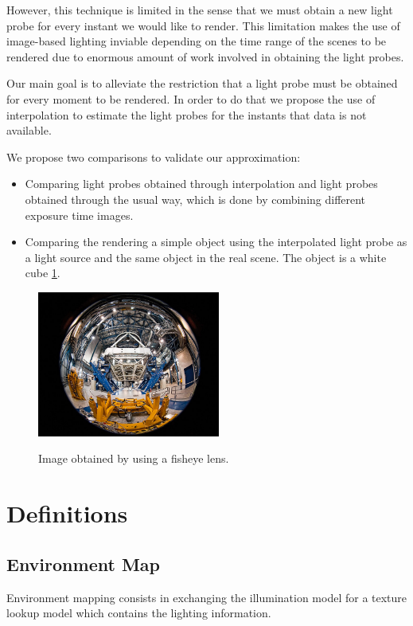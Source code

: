 \documentclass[conference]{acmsiggraph}
\begin{document}
However, this technique is limited in the sense that we must obtain a new light probe for every instant we would like to render. This limitation makes the use of image-based lighting 
inviable depending on the time range of the scenes to be rendered due to enormous amount of work involved in obtaining the light probes.

Our main goal is to alleviate the restriction that a light probe must be obtained for every moment to be rendered. In order to do that we propose the use of interpolation to estimate 
the light probes for the instants that data is not available.

We propose two comparisons to validate our approximation:
\begin{itemize}
	\item Comparing light probes obtained through interpolation and light probes obtained through the usual way, which is done by combining different exposure time images.
	\item Comparing the rendering a simple object using the interpolated light probe as a light source and the same object in the real scene. The object is a white cube \ref{fig:whitecube}.
\end{itemize}

\begin{figure}[!ht]
	\caption{Image obtained by using a fisheye lens.}
	\centering
	\includegraphics[width=6cm]{images/fisheye.jpg}
	\label{fig:whitecube}
\end{figure}

\section{Definitions}

\subsection{Environment Map}

	Environment mapping \cite{hughes2013} consists in exchanging the illumination model for a texture lookup model which contains the lighting information.
\end{document}
